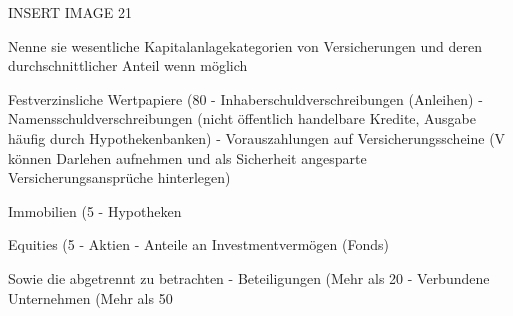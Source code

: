 INSERT IMAGE 21


Nenne sie wesentliche Kapitalanlagekategorien von Versicherungen und deren durchschnittlicher Anteil wenn möglich

Festverzinsliche Wertpapiere (80%
- Inhaberschuldverschreibungen (Anleihen)
- Namensschuldverschreibungen (nicht öffentlich handelbare Kredite, Ausgabe häufig durch Hypothekenbanken)
- Vorauszahlungen auf Versicherungsscheine (V können Darlehen aufnehmen und als Sicherheit angesparte Versicherungsansprüche hinterlegen)

Immobilien (5%
- Hypotheken

Equities (5%
- Aktien 
- Anteile an Investmentvermögen (Fonds)

Sowie die abgetrennt zu betrachten
- Beteiligungen (Mehr als 20%
- Verbundene Unternehmen (Mehr als 50%
